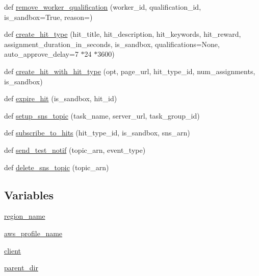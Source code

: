 \begin{DoxyCompactItemize}
\item 
def \hyperlink{namespaceparlai_1_1mturk_1_1core_1_1mturk__utils_a9221bb896f04cca6c0acac4bc127fdbf}{remove\+\_\+worker\+\_\+qualification} (worker\+\_\+id, qualification\+\_\+id, is\+\_\+sandbox=True, reason=\textquotesingle{}\textquotesingle{})
\item 
def \hyperlink{namespaceparlai_1_1mturk_1_1core_1_1mturk__utils_a2812666cca37ae0fa15e1843d3a87cd4}{create\+\_\+hit\+\_\+type} (hit\+\_\+title, hit\+\_\+description, hit\+\_\+keywords, hit\+\_\+reward, assignment\+\_\+duration\+\_\+in\+\_\+seconds, is\+\_\+sandbox, qualifications=None, auto\+\_\+approve\+\_\+delay=7 $\ast$24 $\ast$3600)
\item 
def \hyperlink{namespaceparlai_1_1mturk_1_1core_1_1mturk__utils_a2e92dde4f8ec17749f22f83b6d362d4f}{create\+\_\+hit\+\_\+with\+\_\+hit\+\_\+type} (opt, page\+\_\+url, hit\+\_\+type\+\_\+id, num\+\_\+assignments, is\+\_\+sandbox)
\item 
def \hyperlink{namespaceparlai_1_1mturk_1_1core_1_1mturk__utils_a960c8639f5fa43ab8be109eb48ea1925}{expire\+\_\+hit} (is\+\_\+sandbox, hit\+\_\+id)
\item 
def \hyperlink{namespaceparlai_1_1mturk_1_1core_1_1mturk__utils_a98c01409407393818d100c21a4e07742}{setup\+\_\+sns\+\_\+topic} (task\+\_\+name, server\+\_\+url, task\+\_\+group\+\_\+id)
\item 
def \hyperlink{namespaceparlai_1_1mturk_1_1core_1_1mturk__utils_accc5838e30ccf9ab95050ab11ac0d973}{subscribe\+\_\+to\+\_\+hits} (hit\+\_\+type\+\_\+id, is\+\_\+sandbox, sns\+\_\+arn)
\item 
def \hyperlink{namespaceparlai_1_1mturk_1_1core_1_1mturk__utils_a03b8f25675cb76e8b27205ca5d26e623}{send\+\_\+test\+\_\+notif} (topic\+\_\+arn, event\+\_\+type)
\item 
def \hyperlink{namespaceparlai_1_1mturk_1_1core_1_1mturk__utils_a669fa20824749469221df338aa8a0e8e}{delete\+\_\+sns\+\_\+topic} (topic\+\_\+arn)
\end{DoxyCompactItemize}
\subsection*{Variables}
\begin{DoxyCompactItemize}
\item 
\hyperlink{namespaceparlai_1_1mturk_1_1core_1_1mturk__utils_ad0a9dc2f8850801695a04db7336ea8a0}{region\+\_\+name}
\item 
\hyperlink{namespaceparlai_1_1mturk_1_1core_1_1mturk__utils_a88d674a0da32d6e18efb156346c59890}{aws\+\_\+profile\+\_\+name}
\item 
\hyperlink{namespaceparlai_1_1mturk_1_1core_1_1mturk__utils_a46a5a1362c84f2ab158459d11e5ff75b}{client}
\item 
\hyperlink{namespaceparlai_1_1mturk_1_1core_1_1mturk__utils_a707afd86b31fd970b726f481d15f570a}{parent\+\_\+dir}
\end{DoxyCompactItemize}


